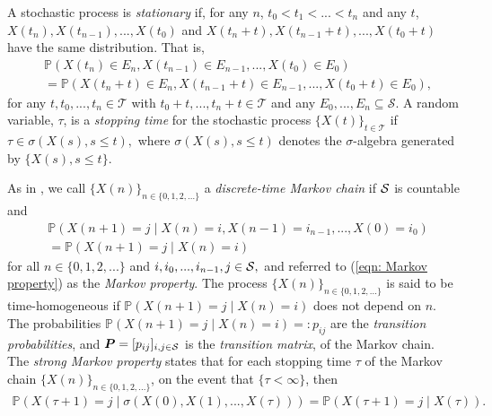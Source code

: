 A stochastic process is \emph{stationary} if, for any \(n\), \(t_0<t_1<...<t_n\) and any \(t\), \(X(t_n),X(t_{n-1}),...,X(t_0)\) and \(X(t_n+t),X(t_{n-1}+t),...,X(t_0+t)\) have the same distribution. That is, 
\begin{align}\label{eqn: stationary}
	&\nonumber\mathbb P(X(t_n)\in E_n,X(t_{n-1})\in E_{n-1},...,X(t_0)\in E_0) 
	\\&= \mathbb P(X(t_n+t)\in E_n,X(t_{n-1}+t)\in E_{n-1},...,X(t_0+t)\in E_0),
\end{align}
for any \(t,t_0,...,t_n\in\mathcal T\) with \(t_0+t,...,t_n+t\in\mathcal T\) and any \(E_0,...,E_n\subseteq \mathcal S\). A random variable, \(\tau\), is a \emph{stopping time} for the stochastic process \(\{X(t)\}_{t\in\mathcal T}\) if \(\tau\in\sigma(X(s), s\leq t),\) where \(\sigma(X(s), s\leq t)\) denotes the \(\sigma\)-algebra generated by \(\{X(s), s\leq t\}\).

As in \cite[Chapter~1.2]{MEinAP}, we call \(\{X(n)\}_{n\in\{0,1,2,\dots\}}\) a \emph{discrete-time Markov chain} if \(\mathcal{S}\) is countable and
\begin{align}\label{eqn: Markov property}
	\nonumber &\mathbb P(X(n+1)=j \mid X(n)=i,X(n-1)=i_{n-1},...,X(0)=i_0) 
	\\&= \mathbb P(X(n+1)=j \mid X(n)=i) 
\end{align}
for all \(n\in\{0,1,2,...\}\) and \(i,i_0,...,i_{n-1},j\in\mathcal{S},\) and referred to (\ref{eqn: Markov property}) as the \emph{Markov property}. The process \(\{X(n)\}_{n\in\{0,1,2,...\}}\) is said to be time-homogeneous if 
\(\mathbb P(X(n+1)=j \mid X(n)=i)\) does not depend on \(n\). The probabilities \(\mathbb P(X(n+1)=j \mid X(n)=i)=:p_{ij}\) are the \emph{transition probabilities}, and \(\boldsymbol P=[p_{ij}]_{i,j\in\mathcal{S}}\) is the \emph{transition matrix}, of the Markov chain. The \emph{strong Markov property} states that for each stopping time \(\tau\) of the Markov chain \(\{X(n)\}_{n\in\{0,1,2,...\}}\), on the event that \(\{\tau<\infty\}\), then 
\begin{align}\label{eqn: strong Markov property}
	\mathbb P(X(\tau+1)=j \mid \sigma(X(0),X(1),...,X(\tau))) = \mathbb P(X(\tau+1)=j \mid X(\tau)).
\end{align}

